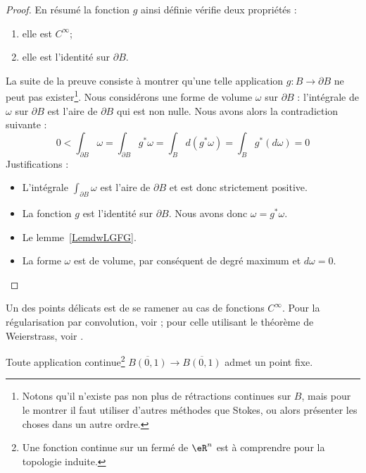 \begin{proof}
	En résumé la fonction \( g\) ainsi définie vérifie deux propriétés :
	\begin{enumerate}
		\item
		      elle est \(  C^{\infty}\);
		\item
		      elle est l'identité sur \( \partial B\).
	\end{enumerate}
	La suite de la preuve consiste à montrer qu'une telle application \( g\colon B\to \partial B\) ne peut pas exister\footnote{Notons qu'il n'existe pas non plus de rétractions continues sur \( B\), mais pour le montrer il faut utiliser d'autres méthodes que Stokes, ou alors présenter les choses dans un autre ordre.}. Nous considérons une forme de volume \( \omega\) sur \( \partial B\) : l'intégrale de \( \omega\) sur \( \partial B\) est l'aire de \( \partial B\) qui est non nulle. Nous avons alors la contradiction suivante :
	\begin{equation}
		0<\int_{\partial B}\omega
		=\int_{\partial B}g^*\omega
		=\int_Bd(g^*\omega)
		=\int_Bg^*(d\omega)
		=0
	\end{equation}
	Justifications :
	\begin{itemize}
		\item
		      L'intégrale \( \int_{\partial B}\omega\) est l'aire de \( \partial B\) et est donc strictement positive.       %
		\item
		      La fonction \( g\) est l'identité sur \( \partial B\). Nous avons donc \( \omega=g^*\omega\).
		\item
		      Le lemme~\ref{LemdwLGFG}.
		\item
		      La forme \( \omega\) est de volume, par conséquent de degré maximum et \( d\omega=0\).      %
	\end{itemize}
\end{proof}

Un des points délicats est de se ramener au cas de fonctions \( C^{\infty}\). Pour la régularisation par convolution, voir \cite{AllardBrouwer}; pour celle utilisant le théorème de Weierstrass, voir \cite{KuttlerTopInAl}.
\begin{theorem} 		\label{ThoRGjGdO}
	Toute application continue\footnote{Une fonction continue sur un fermé de \( \eR^n\) est à comprendre pour la topologie induite.} \( \overline{B(0,1)}  \to \overline{B(0,1)}\) admet un point fixe.
\end{theorem}

